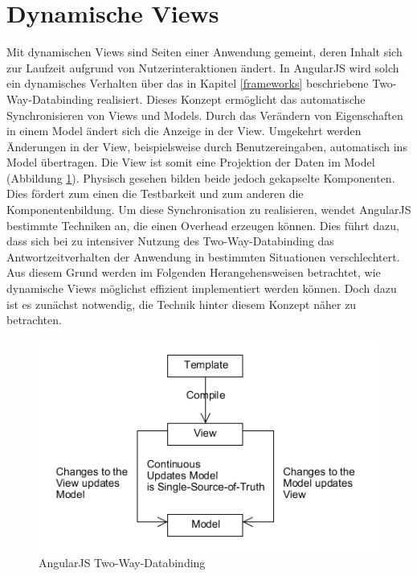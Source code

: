 \section{Dynamische Views}
\label{dv-main}
Mit dynamischen Views sind Seiten einer Anwendung gemeint, deren Inhalt sich zur Laufzeit aufgrund von Nutzerinteraktionen ändert. In AngularJS wird solch ein dynamisches Verhalten über das in Kapitel \ref{frameworks} beschriebene Two-Way-Databinding realisiert. Dieses Konzept ermöglicht das automatische Synchronisieren von Views und Models. Durch das Verändern von Eigenschaften in einem Model ändert sich die Anzeige in der View. Umgekehrt werden Änderungen in der View, beispielsweise durch Benutzereingaben, automatisch ins Model übertragen. Die View ist somit eine Projektion der Daten im Model (Abbildung \ref{angularjs-two-way-databinding}). Physisch gesehen bilden beide jedoch gekapselte Komponenten. Dies fördert zum einen die Testbarkeit und zum anderen die Komponentenbildung\cite{AngularJSDataBinding}. Um diese Synchronisation zu realisieren, wendet AngularJS bestimmte Techniken an, die einen Overhead erzeugen können. Dies führt dazu, dass sich bei zu intensiver Nutzung des Two-Way-Databinding das Antwortzeitverhalten der Anwendung in bestimmten Situationen verschlechtert. Aus diesem Grund werden im Folgenden Herangehensweisen betrachtet, wie dynamische Views möglichst effizient implementiert werden können. Doch dazu ist es zunächst notwendig, die Technik hinter diesem Konzept näher zu betrachten.
\begin{figure}[h]
	\centering
	\includegraphics[scale=0.5]{Bilder/Two_Way_Data_Binding.png}
	\caption{AngularJS Two-Way-Databinding}
	\label{angularjs-two-way-databinding}
\end{figure}
